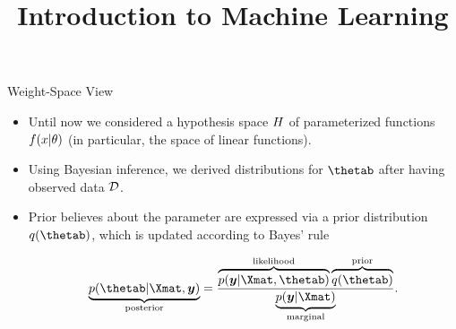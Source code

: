 




\newcommand{\titlefigure}{figure_man/discrete/marginalization-more.png} %
\newcommand{\learninggoals}{
  \item GPs model distributions over functions 
  \item The marginalization property makes this distribution easily tractable
  \item GPs are fully specified by mean and covariance function 
  \item GPs are indexed families
}

\title{Introduction to Machine Learning}
\date{}





\begin{vbframe}{Weight-Space View}

\begin{itemize}
  \item Until now we considered a hypothesis space $H$ of parameterized functions $f(x | \theta)$ (in particular, the space of linear functions). 
  \item Using Bayesian inference, we derived distributions for $\thetab$ after having observed data $\mathcal{D}$. 
  \item Prior believes about the parameter are expressed via a prior distribution $q(\thetab)$, which is updated according to Bayes' rule 

  $$
  \underbrace{p(\thetab | \Xmat, \yv)}_{\text{posterior}} = \frac{\overbrace{p(\yv | \Xmat, \thetab)}^{\text{likelihood}}\overbrace{q(\thetab)}^{\text{prior}}}{\underbrace{p(\yv|\Xmat)}_{\text{marginal}}}. 
  $$
\end{itemize}

\end{vbframe}


